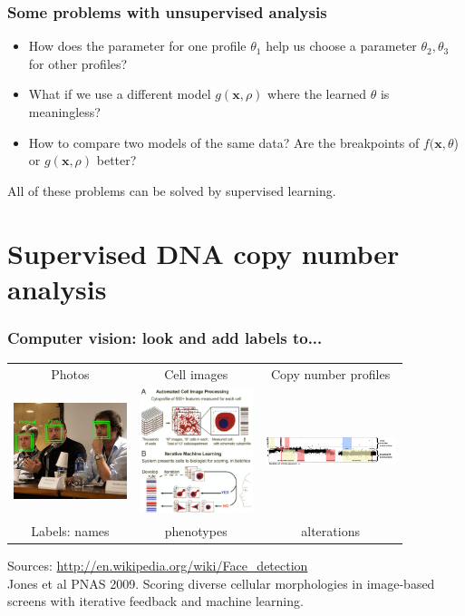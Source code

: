\documentclass{beamer}
\begin{document}
\begin{frame}
  \frametitle{Some problems with unsupervised analysis}
  \begin{itemize}
  \item How does the parameter for one profile $\theta_1$ help us
    choose a parameter $\theta_2, \theta_3$ for other profiles?
  \item What if we use a different model $g(\mathbf x, \rho)$ where
    the learned $\theta$ is meaningless?
  \item How to compare two models of the same data? Are the
    breakpoints of $f(\mathbf x, \theta$) or $g(\mathbf x, \rho)$
    better? 
  \end{itemize}

  All of these problems can be solved by supervised learning.
\end{frame}

\section{Supervised DNA copy number analysis}

\begin{frame}
  \frametitle{Computer vision: look and add labels to...}
  \begin{tabular}{ccc}
    Photos & Cell images & Copy number profiles \\
    \includegraphics[width=1.3in]{faces} &
    \includegraphics[width=1.3in]{cellprofiler} &
    \includegraphics[width=1.5in]{regions-axes}\\
    Labels: names & phenotypes & alterations
  \end{tabular}
  Sources: \url{http://en.wikipedia.org/wiki/Face_detection}\\
  Jones et al PNAS 2009. Scoring diverse cellular morphologies in
  image-based screens with iterative feedback and machine learning.
\end{frame}
\end{document}
